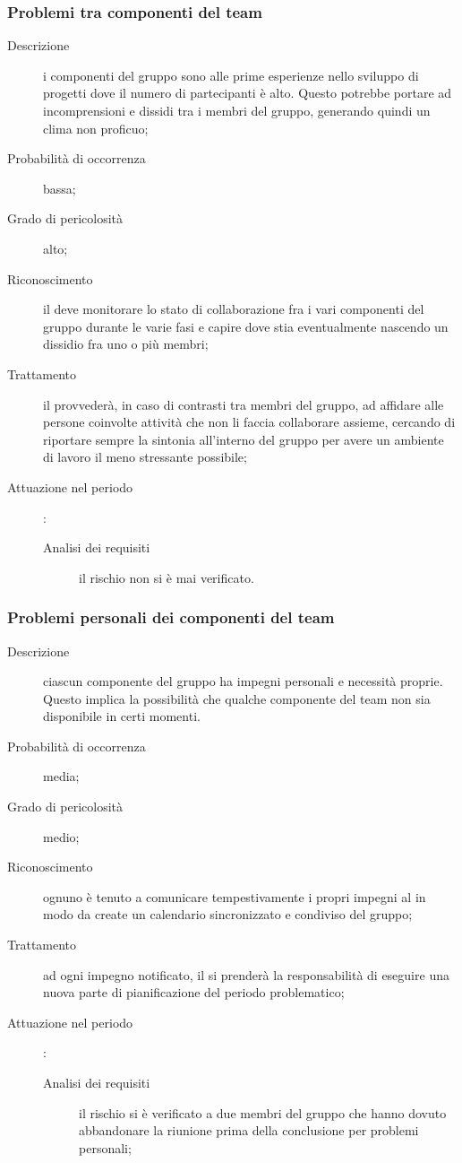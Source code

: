 		\subsubsection{Problemi tra componenti del team}
		\begin{description}
			\item[Descrizione] i componenti del gruppo sono alle prime esperienze nello sviluppo di progetti dove il numero di partecipanti è alto. Questo potrebbe portare ad incomprensioni e dissidi tra i membri del gruppo, generando quindi un clima non proficuo;
			\item[Probabilità di occorrenza] bassa;
			\item[Grado di pericolosità] alto;
			\item[Riconoscimento] il \Rx{} deve monitorare lo stato di collaborazione fra i vari componenti del gruppo durante le varie fasi e capire dove stia eventualmente nascendo un dissidio fra uno o più membri;
			\item[Trattamento] il \Rx{} provvederà, in caso di contrasti tra membri del gruppo, ad affidare alle persone coinvolte attività che non li faccia collaborare assieme, cercando di riportare sempre la sintonia all'interno del gruppo per avere un ambiente di lavoro il meno stressante possibile;
			\item[Attuazione nel periodo]:
			\begin{description}
				\item[Analisi dei requisiti] il rischio non si è mai verificato.
			\end{description}
		\end{description}
		\subsubsection{Problemi personali dei componenti del team}
		\begin{description}
			\item[Descrizione] ciascun componente del gruppo ha impegni personali e necessità proprie. Questo implica la possibilità che qualche componente del team non sia disponibile in certi momenti.
			\item[Probabilità di occorrenza] media;
			\item[Grado di pericolosità] medio;
			\item[Riconoscimento] ognuno è tenuto a comunicare tempestivamente i propri impegni al \Rx{} in modo da create un calendario sincronizzato e condiviso del gruppo;
			\item[Trattamento] ad ogni impegno notificato, il \Rx{} si prenderà la responsabilità di eseguire una nuova parte di pianificazione del periodo problematico; 
			\item[Attuazione nel periodo]:
			\begin{description}
				\item[Analisi dei requisiti] il rischio si è verificato  a due membri del gruppo che hanno dovuto abbandonare la riunione prima della conclusione per problemi personali;
			\end{description}
		\end{description}
